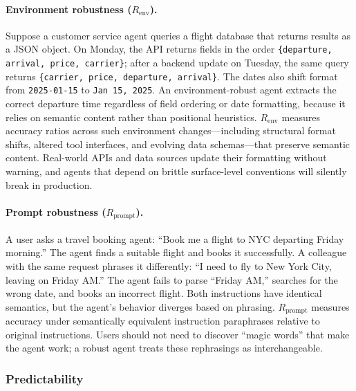\documentclass[11pt]{article}
\begin{document}
\paragraph{Environment robustness ($R_{\text{env}}$).}
Suppose a customer service agent queries a flight database that returns results as a JSON object.
On Monday, the API returns fields in the order \texttt{\{departure, arrival, price, carrier\}}; after a backend update on Tuesday, the same query returns \texttt{\{carrier, price, departure, arrival\}}.
The dates also shift format from \texttt{2025-01-15} to \texttt{Jan 15, 2025}.
An environment-robust agent extracts the correct departure time regardless of field ordering or date formatting, because it relies on semantic content rather than positional heuristics.
$R_{\text{env}}$ measures accuracy ratios across such environment changes---including structural format shifts, altered tool interfaces, and evolving data schemas---that preserve semantic content.
Real-world APIs and data sources update their formatting without warning, and agents that depend on brittle surface-level conventions will silently break in production.

\paragraph{Prompt robustness ($R_{\text{prompt}}$).}
A user asks a travel booking agent: ``Book me a flight to NYC departing Friday morning.''
The agent finds a suitable flight and books it successfully.
A colleague with the same request phrases it differently: ``I need to fly to New York City, leaving on Friday AM.''
The agent fails to parse ``Friday AM,'' searches for the wrong date, and books an incorrect flight.
Both instructions have identical semantics, but the agent's behavior diverges based on phrasing.
$R_{\text{prompt}}$ measures accuracy under semantically equivalent instruction paraphrases relative to original instructions.
Users should not need to discover ``magic words'' that make the agent work; a robust agent treats these rephrasings as interchangeable.

\subsubsection{Predictability}
\end{document}
